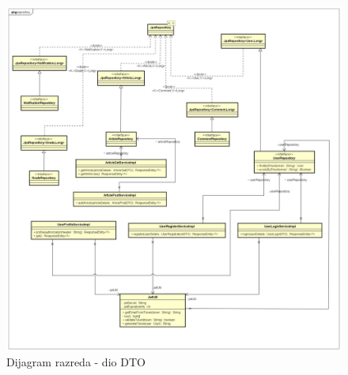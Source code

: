 \eject

\begin{figure}[H]
	\includegraphics[scale=0.4]{slike/DijagramRazreda2.jpg}
	\centering
	\caption{Dijagram razreda - dio DTO}
	\label{fig:class_diagram_dto}
\end{figure}

\eject


